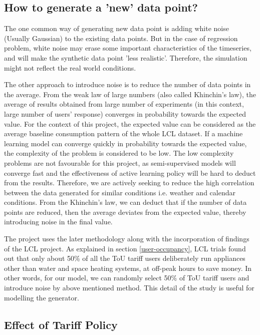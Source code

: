 \subsection{How to generate a 'new' data point?}
\label{new-data-generator}
The one common way of generating new data point is adding white noise (Usually Gaussian) to the existing data points. But in the case of regression problem, white noise may erase some important characteristics of the timeseries, and will make the synthetic data point 'less realistic'. Therefore, the simulation might not reflect the real world conditions.

The other approach to introduce noise is to reduce the number of data points in the average. From the weak law of large numbers (also called Khinchin's law), the average of results obtained from large number of experiments (in this context, large number of users' response)  converges in probability towards the expected value. For the context of this project, the expected value can be considered as the average baseline consumption pattern of the whole LCL dataset. If a machine learning model can converge quickly in probability towards the expected value, the complexity of the problem is considered to be low. The low complexity problems are not favourable for this project, as semi-supervised models will converge fast and the effectiveness of active learning policy will be hard to deduct from the results. Therefore, we are actively seeking to reduce the high correlation between the data generated for similar conditions i.e. weather and calendar conditions. From the Khinchin's law, we can deduct that if the number of data points are reduced, then the average deviates from the expected value, thereby introducing noise in the final value.

The project uses the later methodology along with the incorporation of findings of the LCL project. As explained in section \ref{user-occupancy}, LCL trials found out that only about 50\% of all the ToU tariff users deliberately run appliances other than water and space heating systems, at off-peak hours to save money. In other words, for our model, we can randomly select 50\% of ToU tariff users and introduce noise by above mentioned method. This detail of the study is useful for modelling the generator.

\subsection{Effect of Tariff Policy}

